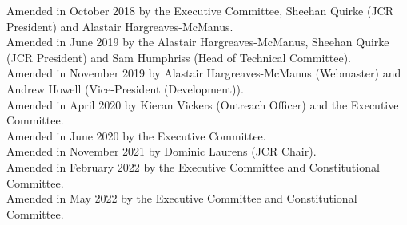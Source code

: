 \documentclass[12pt]{article}
\begin{document}
Amended in October 2018 by the Executive Committee, Sheehan Quirke (JCR President) and Alastair Hargreaves-McManus.\\
Amended in June 2019 by the Alastair Hargreaves-McManus, Sheehan Quirke (JCR President) and Sam Humphriss (Head of Technical Committee).\\
Amended in November 2019 by Alastair Hargreaves-McManus (Webmaster) and Andrew Howell (Vice-President (Development)).\\
Amended in April 2020 by Kieran Vickers (Outreach Officer) and the Executive Committee.\\
Amended in June 2020 by the Executive Committee.\\
Amended in November 2021 by Dominic Laurens (JCR Chair).\\
Amended in February 2022 by the Executive Committee and Constitutional Committee.\\
Amended in May 2022 by the Executive Committee and Constitutional Committee.

\newpage
\tableofcontents{}
\newpage
\end{document}
